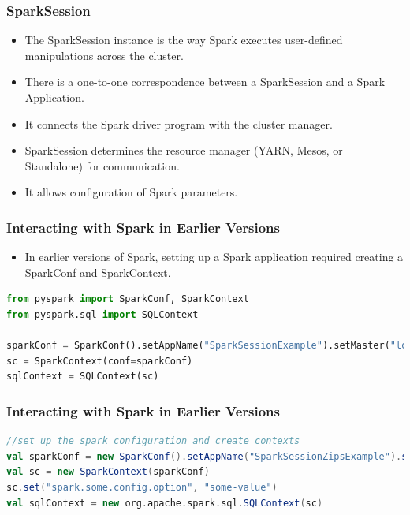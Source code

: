 \begin{frame}
    \frametitle{SparkSession}
    \begin{itemize}
        \item The SparkSession instance is the way Spark executes user-defined manipulations across the cluster.
        \item There is a one-to-one correspondence between a SparkSession and a Spark Application.
        \item It connects the Spark driver program with the cluster manager.
        \item SparkSession determines the resource manager (YARN, Mesos, or Standalone) for communication.
        \item It allows configuration of Spark parameters.
    \end{itemize}
\end{frame}


\begin{frame}[fragile]
    \frametitle{Interacting with Spark in Earlier Versions}

    \begin{itemize}
        \item In earlier versions of Spark, setting up a Spark application required creating a SparkConf and SparkContext.
    \end{itemize}

    \begin{lstlisting}[language=Python,label={lst:pyspark-spark-context},caption={Create SparkContext in old Spark versions}]
from pyspark import SparkConf, SparkContext
from pyspark.sql import SQLContext

sparkConf = SparkConf().setAppName("SparkSessionExample").setMaster("local")
sc = SparkContext(conf=sparkConf)
sqlContext = SQLContext(sc)
    \end{lstlisting}

\end{frame}


\begin{frame}[fragile]
    \frametitle{Interacting with Spark in Earlier Versions}

    \begin{lstlisting}[language=Scala,label={lst:scala-spark-context},caption={Scala: Create SparkContext in old Spark versions}]
//set up the spark configuration and create contexts
val sparkConf = new SparkConf().setAppName("SparkSessionZipsExample").setMaster("local")
val sc = new SparkContext(sparkConf)
sc.set("spark.some.config.option", "some-value")
val sqlContext = new org.apache.spark.sql.SQLContext(sc)
    \end{lstlisting}

\end{frame}


